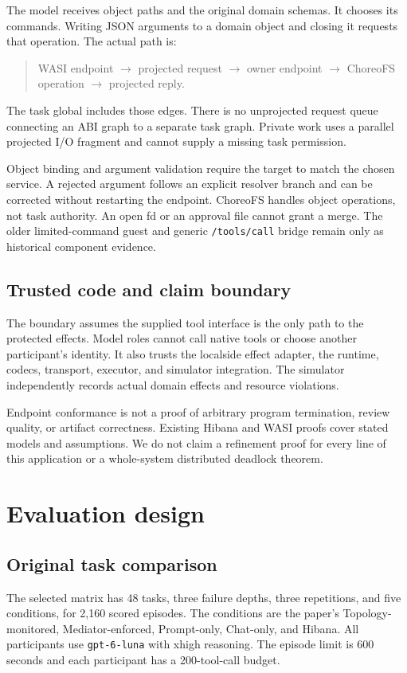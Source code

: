 \documentclass[10pt]{article}
\begin{document}
The model receives object paths and the original domain schemas. It chooses
its commands. Writing JSON arguments to a domain object and closing it requests
that operation. The actual path is:
\begin{quote}
WASI endpoint $\rightarrow$ projected request $\rightarrow$ owner endpoint
$\rightarrow$ ChoreoFS operation $\rightarrow$ projected reply.
\end{quote}
The task global includes those edges. There is no unprojected request queue
connecting an ABI graph to a separate task graph. Private work uses a parallel
projected I/O fragment and cannot supply a missing task permission.

Object binding and argument validation require the target to match the chosen
service. A rejected argument follows an explicit resolver branch and can be
corrected without restarting the endpoint. ChoreoFS handles object operations,
not task authority. An open fd or an approval file cannot grant a merge.
The older limited-command guest and generic \texttt{/tools/call} bridge remain
only as historical component evidence.

\subsection{Trusted code and claim boundary}
The boundary assumes the supplied tool interface is the only path to the
protected effects. Model roles cannot call native tools or choose another
participant's identity. It also trusts the localside effect adapter, the
runtime, codecs, transport, executor, and simulator integration. The simulator
independently records actual domain effects and resource violations.

Endpoint conformance is not a proof of arbitrary program termination, review
quality, or artifact correctness. Existing Hibana and WASI proofs cover stated
models and assumptions. We do not claim a refinement proof for every line of
this application or a whole-system distributed deadlock theorem.

\section{Evaluation design}
\subsection{Original task comparison}
The selected matrix has 48 tasks, three failure depths, three repetitions,
and five conditions, for 2,160 scored episodes. The conditions are the paper's
Topology-monitored, Mediator-enforced, Prompt-only, Chat-only, and Hibana.
All participants use \texttt{gpt-6-luna} with xhigh reasoning. The episode limit
is 600 seconds and each participant has a 200-tool-call budget.
\end{document}
